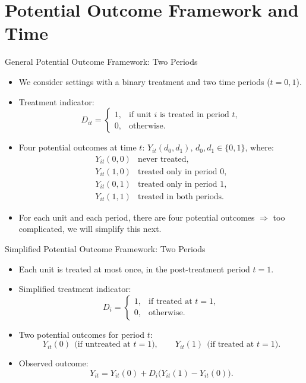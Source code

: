 \documentclass[11pt,aspectratio=169]{beamer}
\begin{document}
\section{Potential Outcome Framework and Time}

\begin{frame}{General Potential Outcome Framework: Two Periods}
\begin{itemize}
  \item We consider settings with a binary treatment and two time periods ($t=0,1$).
  \item Treatment indicator:
  \[
    D_{it}=
    \begin{cases}
      1, & \text{if unit } i \text{ is treated in period } t,\\
      0, & \text{otherwise.}
    \end{cases}
  \]
  \item Four potential outcomes at time $t$: $Y_{it}(d_0,d_1)$, \quad $d_0,d_1\in\{0,1\}$, where:
  \[
    \begin{array}{ll}
      Y_{it}(0,0) & \text{never treated,}\\
      Y_{it}(1,0) & \text{treated only in period } 0,\\
      Y_{it}(0,1) & \text{treated only in period } 1,\\
      Y_{it}(1,1) & \text{treated in both periods.}
    \end{array}
  \]
  \item For each unit and each period, there are four potential outcomes $\Rightarrow$ too complicated, we will simplify this next.
\end{itemize}
\end{frame}

\begin{frame}{Simplified Potential Outcome Framework: Two Periods}
\begin{itemize}
  \item Each unit is treated at most once, in the post-treatment period $t=1$.
  \item Simplified treatment indicator:
  \[
    D_i=
    \begin{cases}
      1, & \text{if treated at } t=1,\\
      0, & \text{otherwise.}
    \end{cases}
  \]
  \item Two potential outcomes for period $t$:
  \[
    Y_{it}(0)\ \ \text{(if untreated at } t=1\text{)},\qquad
    Y_{it}(1)\ \ \text{(if treated at } t=1\text{)}.
  \]
  \item Observed outcome:
  \[
    Y_{it}=Y_{it}(0)+D_i\bigl(Y_{it}(1)-Y_{it}(0)\bigr).
  \]
\end{itemize}
\end{frame}
\end{document}
